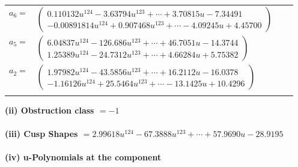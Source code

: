 \documentclass[1p]{elsarticle_modified}
\theoremstyle{definition}
\begin{document}
\begin{tabular}{m{7pt} m{180pt} m{7pt} m{180pt} }
\flushright $a_{6}=$&$\begin{pmatrix}0.110132 u^{124}-3.63794 u^{123}+\cdots+3.70815 u-7.34491\\-0.00891814 u^{124}+0.907468 u^{123}+\cdots-4.09245 u+4.45700\end{pmatrix}$ \\
\flushright $a_{5}=$&$\begin{pmatrix}6.04837 u^{124}-126.686 u^{123}+\cdots+46.7051 u-14.3744\\1.25389 u^{124}-24.7312 u^{123}+\cdots+4.66284 u+5.75382\end{pmatrix}$ \\
\flushright $a_{2}=$&$\begin{pmatrix}1.97982 u^{124}-43.5856 u^{123}+\cdots+16.2112 u-16.0378\\-1.16126 u^{124}+25.5464 u^{123}+\cdots-13.1425 u+10.4296\end{pmatrix}$\\&\end{tabular}
\flushleft \textbf{(ii) Obstruction class $= -1$}\\~\\
\flushleft \textbf{(iii) Cusp Shapes $= 2.99618 u^{124}-67.3888 u^{123}+\cdots+57.9690 u-28.9195$}\\~\\
\newpage\renewcommand{\arraystretch}{1}
\flushleft \textbf{(iv) u-Polynomials at the component}\newline \\
\end{document}
